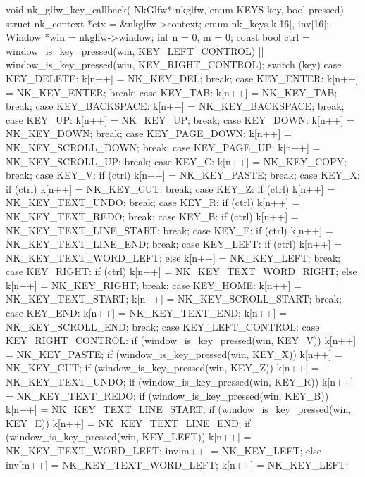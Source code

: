 \begin{multicols}{2}
\begin{ccode}
void nk_glfw_key_callback(
        NkGlfw* nkglfw, enum KEYS key, bool pressed) {
    struct nk_context *ctx = &nkglfw->context;
    enum nk_keys k[16], inv[16];
    Window *win = nkglfw->window;
    int n = 0, m = 0;
    const bool ctrl =
            window_is_key_pressed(win, KEY_LEFT_CONTROL) ||
            window_is_key_pressed(win, KEY_RIGHT_CONTROL);
    switch (key) {
    case KEY_DELETE:      k[n++] = NK_KEY_DEL;             break;
    case KEY_ENTER:       k[n++] = NK_KEY_ENTER;           break;
    case KEY_TAB:         k[n++] = NK_KEY_TAB;             break;
    case KEY_BACKSPACE:   k[n++] = NK_KEY_BACKSPACE;       break;
    case KEY_UP:          k[n++] = NK_KEY_UP;              break;
    case KEY_DOWN:        k[n++] = NK_KEY_DOWN;            break;
    case KEY_PAGE_DOWN:   k[n++] = NK_KEY_SCROLL_DOWN;     break;
    case KEY_PAGE_UP:     k[n++] = NK_KEY_SCROLL_UP;       break;
    case KEY_C:           k[n++] = NK_KEY_COPY;            break;
    case KEY_V: if (ctrl) k[n++] = NK_KEY_PASTE;           break;
    case KEY_X: if (ctrl) k[n++] = NK_KEY_CUT;             break;
    case KEY_Z: if (ctrl) k[n++] = NK_KEY_TEXT_UNDO;       break;
    case KEY_R: if (ctrl) k[n++] = NK_KEY_TEXT_REDO;       break;
    case KEY_B: if (ctrl) k[n++] = NK_KEY_TEXT_LINE_START; break;
    case KEY_E: if (ctrl) k[n++] = NK_KEY_TEXT_LINE_END;   break;
    case KEY_LEFT:
        if (ctrl) k[n++] = NK_KEY_TEXT_WORD_LEFT;
        else k[n++] = NK_KEY_LEFT;
        break;
    case KEY_RIGHT:
        if (ctrl) k[n++] = NK_KEY_TEXT_WORD_RIGHT;
        else k[n++] = NK_KEY_RIGHT;
        break;
    case KEY_HOME:
        k[n++] = NK_KEY_TEXT_START; k[n++] = NK_KEY_SCROLL_START;
        break;
    case KEY_END:
        k[n++] = NK_KEY_TEXT_END;   k[n++] = NK_KEY_SCROLL_END;
        break;
    case KEY_LEFT_CONTROL:
    case KEY_RIGHT_CONTROL:
        if (window_is_key_pressed(win, KEY_V))
            k[n++] = NK_KEY_PASTE;
        if (window_is_key_pressed(win, KEY_X))
            k[n++] = NK_KEY_CUT;
        if (window_is_key_pressed(win, KEY_Z))
            k[n++] = NK_KEY_TEXT_UNDO;
        if (window_is_key_pressed(win, KEY_R))
            k[n++] = NK_KEY_TEXT_REDO;
        if (window_is_key_pressed(win, KEY_B))
            k[n++] = NK_KEY_TEXT_LINE_START;
        if (window_is_key_pressed(win, KEY_E))
            k[n++] = NK_KEY_TEXT_LINE_END;
        if (window_is_key_pressed(win, KEY_LEFT)) {
            k[n++] = NK_KEY_TEXT_WORD_LEFT;
            inv[m++] = NK_KEY_LEFT;
        } else {
            inv[m++] = NK_KEY_TEXT_WORD_LEFT;
            k[n++] = NK_KEY_LEFT;
}}}
\end{ccode}
\end{multicols}
